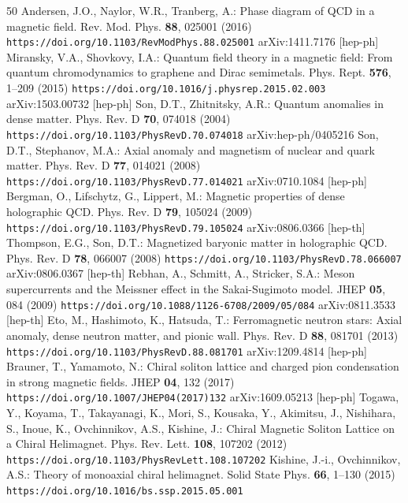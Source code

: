\begin{thebibliography}{50}
\providecommand{\url}[1]{\texttt{#1}}
 Andersen, J.O., Naylor, W.R., Tranberg, A.: Phase diagram of QCD in a magnetic field. Rev. Mod. Phys. \textbf{88}, 025001 (2016) \url{https://doi.org/10.1103/RevModPhys.88.025001} arXiv:1411.7176 [hep-ph]
 Miransky, V.A., Shovkovy, I.A.: Quantum field theory in a magnetic field: From quantum chromodynamics to graphene and Dirac semimetals. Phys. Rept. \textbf{576}, 1--209 (2015) \url{https://doi.org/10.1016/j.physrep.2015.02.003} arXiv:1503.00732 [hep-ph]
 Son, D.T., Zhitnitsky, A.R.: Quantum anomalies in dense matter. Phys. Rev. D \textbf{70}, 074018 (2004) \url{https://doi.org/10.1103/PhysRevD.70.074018} arXiv:hep-ph/0405216
 Son, D.T., Stephanov, M.A.: Axial anomaly and magnetism of nuclear and quark matter. Phys. Rev. D \textbf{77}, 014021 (2008) \url{https://doi.org/10.1103/PhysRevD.77.014021} arXiv:0710.1084 [hep-ph]
 Bergman, O., Lifschytz, G., Lippert, M.: Magnetic properties of dense holographic QCD. Phys. Rev. D \textbf{79}, 105024 (2009) \url{https://doi.org/10.1103/PhysRevD.79.105024} arXiv:0806.0366 [hep-th]
 Thompson, E.G., Son, D.T.: Magnetized baryonic matter in holographic QCD. Phys. Rev. D \textbf{78}, 066007 (2008) \url{https://doi.org/10.1103/PhysRevD.78.066007} arXiv:0806.0367 [hep-th]
 Rebhan, A., Schmitt, A., Stricker, S.A.: Meson supercurrents and the Meissner effect in the Sakai-Sugimoto model. JHEP \textbf{05}, 084 (2009) \url{https://doi.org/10.1088/1126-6708/2009/05/084} arXiv:0811.3533 [hep-th]
 Eto, M., Hashimoto, K., Hatsuda, T.: Ferromagnetic neutron stars: Axial anomaly, dense neutron matter, and pionic wall. Phys. Rev. D \textbf{88}, 081701 (2013) \url{https://doi.org/10.1103/PhysRevD.88.081701} arXiv:1209.4814 [hep-ph]
 Brauner, T., Yamamoto, N.: Chiral soliton lattice and charged pion condensation in strong magnetic fields. JHEP \textbf{04}, 132 (2017) \url{https://doi.org/10.1007/JHEP04(2017)132} arXiv:1609.05213 [hep-ph]
 Togawa, Y., Koyama, T., Takayanagi, K., Mori, S., Kousaka, Y., Akimitsu, J., Nishihara, S., Inoue, K., Ovchinnikov, A.S., Kishine, J.: Chiral Magnetic Soliton Lattice on a Chiral Helimagnet. Phys. Rev. Lett. \textbf{108}, 107202 (2012) \url{https://doi.org/10.1103/PhysRevLett.108.107202}
 Kishine, J.-i., Ovchinnikov, A.S.: Theory of monoaxial chiral helimagnet. Solid State Phys. \textbf{66}, 1--130 (2015) \url{https://doi.org/10.1016/bs.ssp.2015.05.001}

\end{thebibliography}
